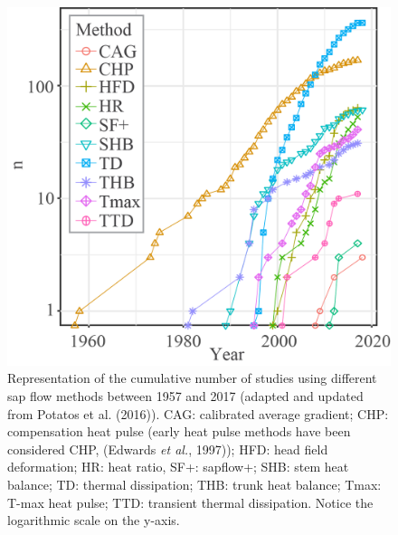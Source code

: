 \documentclass[11pt,twoside]{reedthesis}
\begin{document}
\setlength{\abovecaptionskip}{15pt}
\begin{figure}[hbt!]

{\centering \includegraphics[width=0.8\linewidth]{figure/appendixA/fig1} 

}

\caption[Representation of the cumulative number of studies using different sap flow methods between 1957 and 2017]{Representation of the cumulative number of studies using
different sap flow methods between 1957 and 2017 (adapted and updated
from Potatos et al. (2016)). CAG: calibrated average gradient; CHP:
compensation heat pulse (early heat pulse methods have been considered
CHP, (Edwards \emph{et al.}, 1997)); HFD: head field deformation; HR:
heat ratio, SF+: sapflow+; SHB: stem heat balance; TD: thermal
dissipation; THB: trunk heat balance; Tmax: T-max heat pulse; TTD:
transient thermal dissipation. Notice the logarithmic scale on the
y-axis.}\label{fig:apa11}
\end{figure}
\setlength{\abovecaptionskip}{0pt} \newpage
\end{document}
